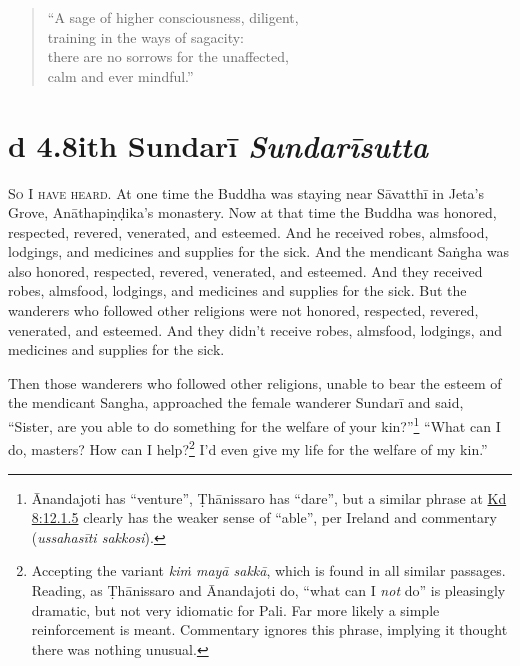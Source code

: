 \documentclass[12pt,openany]{book}%
\newcommand*{\suttatitleacronym}[1]{\smaller[2]{#1}\vspace*{.3em}}
\newcommand*{\suttatitletranslation}[1]{\linebreak{#1}}
\newcommand*{\suttatitleroot}[1]{\linebreak\smaller[2]\itshape{#1}}
\newcommand*{\tocacronym}[1]{\hspace*{-3.3em}{#1}\quad}
\newcommand*{\toctranslation}[1]{#1}
\newcommand*{\tocroot}[1]{(\textit{#1})}
\newcommand*{\scevam}[1]{\textsc{#1}}
\begin{document}
\begin{verse}%
“A sage of higher consciousness, diligent, \\
training in the ways of sagacity: \\
there are no sorrows for the unaffected, \\
calm and ever mindful.” 

%
\end{verse}

%
\section*{{\suttatitleacronym Ud 4.8}{\suttatitletranslation With Sundarī }{\suttatitleroot Sundarīsutta}}
\addcontentsline{toc}{section}{\tocacronym{Ud 4.8} \toctranslation{With Sundarī } \tocroot{Sundarīsutta}}

\scevam{So I have heard. }At one time the Buddha was staying near \textsanskrit{Sāvatthī} in Jeta’s Grove, \textsanskrit{Anāthapiṇḍika}’s monastery. Now at that time the Buddha was honored, respected, revered, venerated, and esteemed. And he received robes, almsfood, lodgings, and medicines and supplies for the sick. And the mendicant \textsanskrit{Saṅgha} was also honored, respected, revered, venerated, and esteemed. And they received robes, almsfood, lodgings, and medicines and supplies for the sick. But the wanderers who followed other religions were not honored, respected, revered, venerated, and esteemed. And they didn’t receive robes, almsfood, lodgings, and medicines and supplies for the sick. 

Then those wanderers who followed other religions, unable to bear the esteem of the mendicant Sangha, approached the female wanderer \textsanskrit{Sundarī} and said, “Sister, are you able to do something for the welfare of your kin?”\footnote{Ānandajoti has “venture”, \textsanskrit{Ṭhānissaro} has “dare”, but a similar phrase at \href{https://suttacentral.net/pli-tv-kd8/en/sujato\#12.1.5}{Kd 8:12.1.5} clearly has the weaker sense of “able”, per Ireland and commentary (\textit{\textsanskrit{ussahasīti} sakkosi}). } “What can I do, masters? How can I help?\footnote{Accepting the variant \textit{\textsanskrit{kiṁ} \textsanskrit{mayā} \textsanskrit{sakkā}}, which is found in all similar passages. Reading, as \textsanskrit{Ṭhānissaro} and Ānandajoti do, “what can I \emph{not} do” is pleasingly dramatic, but not very idiomatic for Pali. Far more likely a simple reinforcement is meant. Commentary ignores this phrase, implying it thought there was nothing unusual. } I’d even give my life for the welfare of my kin.” 
\end{document}
